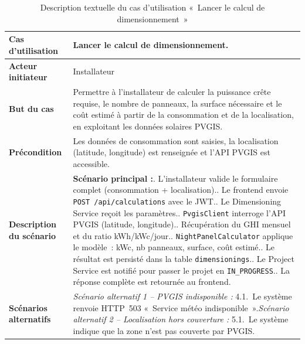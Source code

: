 \begin{table}[H]
  \caption{Description textuelle du cas d'utilisation «~Lancer le calcul de dimensionnement~»}
  \label{tab:cu-lancer-calcul}
  \centering
  \begin{tabularx}{\textwidth}{|L{3.8cm}|X|}
    \hline
    \textbf{Cas d'utilisation} & Lancer le calcul de dimensionnement. \\
    \hline
    \textbf{Acteur initiateur} & Installateur \\
    \hline
    \textbf{But du cas} & Permettre à l'installateur de calculer la puissance crête requise, le nombre de panneaux, la surface nécessaire et le coût estimé à partir de la consommation et de la localisation, en exploitant les données solaires PVGIS. \\
    \hline
    \textbf{Précondition} & Les données de consommation sont saisies, la localisation (latitude, longitude) est renseignée et l'API PVGIS est accessible. \\
    \hline
    \textbf{Description du scénario} &
    \textbf{Scénario principal :}. L'installateur valide le formulaire complet (consommation + localisation).. Le frontend envoie \texttt{POST /api/calculations} avec le JWT.. Le Dimensioning Service reçoit les paramètres.. \texttt{PvgisClient} interroge l'API PVGIS (latitude, longitude).. Récupération du GHI mensuel et du ratio kWh/kWc/jour.. \texttt{NightPanelCalculator} applique le modèle~: kWc, nb panneaux, surface, coût estimé.. Le résultat est persisté dans la table \texttt{dimensionings}.. Le Project Service est notifié pour passer le projet en \texttt{IN\_PROGRESS}.. La réponse complète est retournée au frontend.\\
    \hline
    \textbf{Scénarios alternatifs} &
    \textit{Scénario alternatif 1 -- PVGIS indisponible :}\newline
    \hspace*{6pt}4.1.~Le système renvoie HTTP~503 «~Service météo indisponible~».\newline[2pt]
    \textit{Scénario alternatif 2 -- Localisation hors couverture :}\newline
    \hspace*{6pt}5.1.~Le système indique que la zone n'est pas couverte par PVGIS.\\
    \hline
  \end{tabularx}
\end{table}

